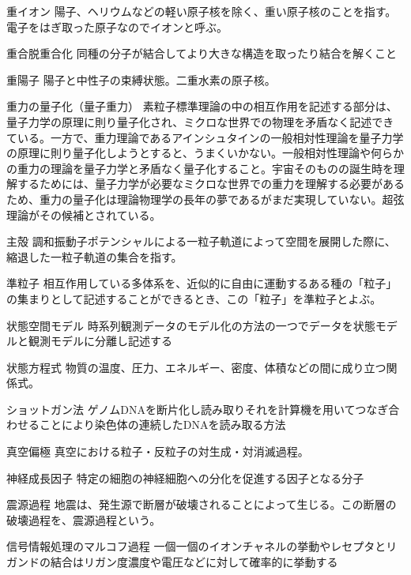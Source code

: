 \begin{用語集}
\item{重イオン}{}
{陽子、ヘリウムなどの軽い原子核を除く、重い原子核のことを指す。電子をはぎ取った原子なのでイオンと呼ぶ。}
\item{重合脱重合化}{}
{同種の分子が結合してより大きな構造を取ったり結合を解くこと}
\item{重陽子}{}
{陽子と中性子の束縛状態。二重水素の原子核。}
\item{重力の量子化（量子重力）}{}
{素粒子標準理論の中の相互作用を記述する部分は、量子力学の原理に則り量子化され、ミクロな世界での物理を矛盾なく記述できている。一方で、重力理論であるアインシュタインの一般相対性理論を量子力学の原理に則り量子化しようとすると、うまくいかない。一般相対性理論や何らかの重力の理論を量子力学と矛盾なく量子化すること。宇宙そのものの誕生時を理解するためには、量子力学が必要なミクロな世界での重力を理解する必要があるため、重力の量子化は理論物理学の長年の夢であるがまだ実現していない。超弦理論がその候補とされている。}
\item{主殻}{}
{調和振動子ポテンシャルによる一粒子軌道によって空間を展開した際に、縮退した一粒子軌道の集合を指す。}
\item{準粒子}{}
{相互作用している多体系を、近似的に自由に運動するある種の「粒子」の集まりとして記述することができるとき、この「粒子」を準粒子とよぶ。}
\item{状態空間モデル}{}
{時系列観測データのモデル化の方法の一つでデータを状態モデルと観測モデルに分離し記述する}
\item{状態方程式}{}
{物質の温度、圧力、エネルギー、密度、体積などの間に成り立つ関係式。}
\item{ショットガン法}{}
{ゲノムDNAを断片化し読み取りそれを計算機を用いてつなぎ合わせることにより染色体の連続したDNAを読み取る方法}
\item{真空偏極}{}
{真空における粒子・反粒子の対生成・対消滅過程。}
\item{神経成長因子}{}
{特定の細胞の神経細胞への分化を促進する因子となる分子}
\item{震源過程}{}
{地震は、発生源で断層が破壊されることによって生じる。この断層の破壊過程を、震源過程という。}
\item{信号情報処理のマルコフ過程}{}
{一個一個のイオンチャネルの挙動やレセプタとリガンドの結合はリガン度濃度や電圧などに対して確率的に挙動する}

\end{用語集}
